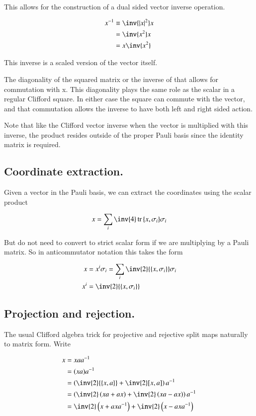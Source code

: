 \documentclass{article}
\DeclareMathOperator{\tr}{tr}
\newcommand{\trace}[1]{\tr{#1}}
\newcommand{\symmetric}[2]{{\{{#1},{#2}\}}}
\newcommand{\antisymmetric}[2]{[{#1},{#2}]}
\begin{document}
This allows for the construction of a dual sided vector inverse operation.

\begin{align*}
x^{-1}
&\equiv \inv{\Abs{x}^2} x \\
&= \inv{x^2} x \\
&= x \inv{x^2} \\
\end{align*}

This inverse is a scaled version of the vector itself.

The diagonality of the squared matrix or the inverse of that allows for commutation with x.  This diagonality plays the same role as the scalar in a regular Clifford square.  In either case the square can commute with the vector, and that 
commutation allows the inverse to have both left and right sided action.

Note that like the Clifford vector inverse when the vector is multiplied with this inverse, the product resides outside of the proper  Pauli basis since the identity matrix is required.

\subsection{ Coordinate extraction. }

Given a vector in the Pauli basis, we can extract the coordinates using the scalar product

\begin{align*}
x = \sum_i \inv{4}\trace{\symmetric{x}{\sigma_i}} \sigma_i
\end{align*}

But do not need to convert to strict scalar form if we are multiplying by a Pauli matrix.  So in anticommutator notation
this takes the form

\begin{align*}
x &= x^i \sigma_i = \sum_i \inv{2}\symmetric{x}{\sigma_i} \sigma_i \\
x^i &= \inv{2}\symmetric{x}{\sigma_i}
\end{align*}

\subsection{ Projection and rejection. }

The usual Clifford algebra trick for projective and rejective split maps naturally to matrix form.  Write

\begin{align*}
x 
&= x a a^{-1} \\
&= (x a) a^{-1} \\
&= \left( \inv{2}\symmetric{x}{a} + \inv{2}\antisymmetric{x}{a} \right) a^{-1} \\
&= \left( \inv{2}\left(x a + a x \right) + \inv{2} \left(x a - a x \right) \right) a^{-1} \\
&= \inv{2}\left(x + a x a^{-1} \right) + \inv{2} \left(x - a x a^{-1} \right) \\
\end{align*}
\end{document}
